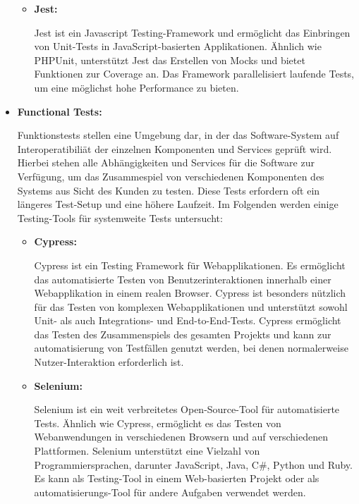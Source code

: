 \begin{itemize}
{\begin{itemize}
            \item {
                \textbf{Jest:}\par
                Jest ist ein Javascript Testing-Framework und ermöglicht das Einbringen von Unit-Tests in
                JavaScript-basierten Applikationen.
                Ähnlich wie PHPUnit, unterstützt Jest das Erstellen von Mocks und bietet Funktionen zur Coverage an.
                Das Framework parallelisiert laufende Tests, um eine möglichst hohe Performance zu bieten.
            }
        \end{itemize}
    }

    \item {
        \textbf{Functional Tests:}\par
        Funktionstests stellen eine Umgebung dar, in der das Software-System auf Interoperatibiliät der
        einzelnen Komponenten und Services geprüft wird.
        Hierbei stehen alle Abhängigkeiten und Services für die Software zur Verfügung, um das Zusammespiel von
        verschiedenen Komponenten des Systems aus Sicht des Kunden zu testen.
        Diese Tests erfordern oft ein längeres Test-Setup und eine höhere Laufzeit.
        Im Folgenden werden einige Testing-Tools für systemweite Tests untersucht:

        \begin{itemize}
            \item {
                \textbf{Cypress:}\par
                Cypress ist ein Testing Framework für Webapplikationen.
                Es ermöglicht das automatisierte Testen von Benutzerinteraktionen innerhalb einer Webapplikation in
                einem realen Browser.
                Cypress ist besonders nützlich für das Testen von komplexen Webapplikationen und unterstützt sowohl
                Unit- als auch Integrations- und End-to-End-Tests.
                Cypress ermöglicht das Testen des Zusammenspiels des gesamten Projekts und kann zur automatisierung
                von Testfällen genutzt werden, bei denen normalerweise Nutzer-Interaktion erforderlich ist.
            }

            \item {
                \textbf{Selenium:}\par
                Selenium ist ein weit verbreitetes Open-Source-Tool für automatisierte Tests.
                Ähnlich wie Cypress, ermöglicht es das Testen von Webanwendungen in verschiedenen Browsern und auf
                verschiedenen Plattformen.
                Selenium unterstützt eine Vielzahl von Programmiersprachen, darunter JavaScript, Java, C\#, Python und
                Ruby.
                Es kann als Testing-Tool in einem Web-basierten Projekt oder als automatisierungs-Tool für andere
                Aufgaben verwendet werden.
            }
        \end{itemize}
    }


\end{itemize}

